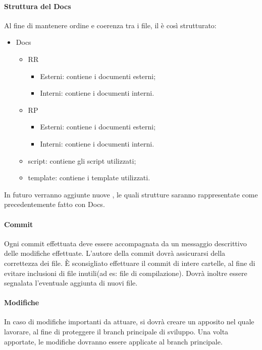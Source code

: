 \paragraph{Struttura del  Docs}
Al fine di mantenere ordine e coerenza tra i file, il  è così strutturato:
\begin{itemize}
	\item Docs
	\begin{itemize}
		\item RR
		\begin{itemize}
			\item Esterni: contiene i documenti esterni;
			\item Interni: contiene i documenti interni.
		\end{itemize}
		\item RP
		\begin{itemize}
			\item Esterni: contiene i documenti esterni;
			\item Interni: contiene i documenti interni.
		\end{itemize}
		\item script: contiene gli script utilizzati;
		\item template: contiene i template utilizzati.
	\end{itemize}
\end{itemize}
In futuro verranno aggiunte nuove , le quali strutture saranno rappresentate come precedentemente fatto con Docs.
\paragraph{Commit}
Ogni commit effettuata deve essere accompagnata da un messaggio descrittivo delle modifiche effettuate. L'autore della commit dovrà assicurarsi della correttezza dei file. È sconsigliato effettuare il commit di intere cartelle, al fine di evitare inclusioni di file inutili(ad es: file di compilazione).
Dovrà inoltre essere segnalata l'eventuale aggiunta di nuovi file.
\paragraph{Modifiche}
In caso di modifiche importanti da attuare, si dovrà creare un  apposito nel quale lavorare, al fine di proteggere il branch principale di sviluppo. Una volta apportate, le modifiche dovranno essere applicate al branch principale.
